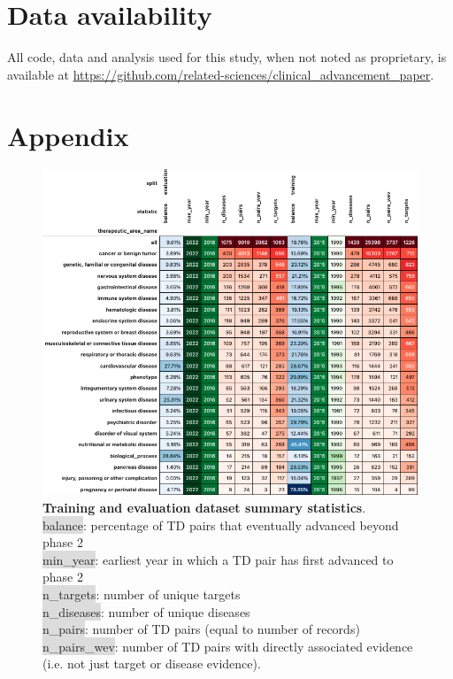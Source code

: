 \documentclass{article}
\begin{document}
\section{Data availability}

All code, data and analysis used for this study, when not noted as proprietary, is available at \url{https://github.com/related-sciences/clinical_advancement_paper}.

\pagebreak

\section{Appendix}

\begin{figure}[H]
  \centering
  \captionsetup{width=.9\linewidth}
  \includegraphics[width=1\textwidth]{dataset_statistics.png}
  \caption{
    \textbf{Training and evaluation dataset summary statistics}.\\\hspace{\textwidth}
    \colorbox{Gainsboro}{balance}: percentage of TD pairs that eventually advanced beyond phase 2 \\\hspace{\textwidth} 
    \colorbox{Gainsboro}{min\_year}: earliest year in which a TD pair has first advanced to phase 2 \\\hspace{\textwidth} 
    \colorbox{Gainsboro}{n\_targets}: number of unique targets \\\hspace{\textwidth} 
    \colorbox{Gainsboro}{n\_diseases}: number of unique diseases \\\hspace{\textwidth} 
    \colorbox{Gainsboro}{n\_pairs}: number of TD pairs (equal to number of records) \\\hspace{\textwidth} 
    \colorbox{Gainsboro}{n\_pairs\_wev}: number of TD pairs with directly associated evidence (i.e. not just target or disease evidence).
  }
  \label{fig:dataset_statistics}
\end{figure}
\end{document}
